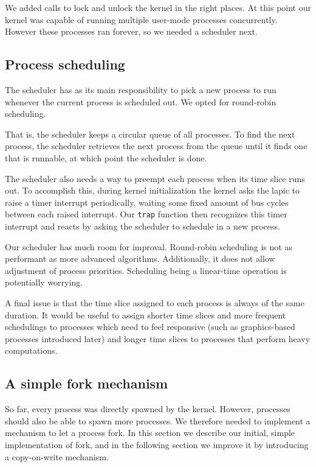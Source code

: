 \documentclass{article}
\begin{document}
We added calls to lock and unlock the kernel in the right places. At this
point our kernel was capable of running multiple user-mode processes
concurrently. However these processes ran forever, so we needed a scheduler
next.


\subsection{Process scheduling}
\label{sec:preempt}
The scheduler has as its main responsibility to pick a new process to run
whenever the current process is scheduled out. We opted for round-robin
scheduling.

That is, the scheduler keeps a circular queue of all processes. To find the
next process, the scheduler retrieves the next process from the queue until it
finds one that is runnable, at which point the scheduler is done.

The scheduler also needs a way to preempt each process when its time slice
runs out. To accomplish this, during kernel initialization the kernel asks the
\gls{lapic} to raise a timer interrupt periodically, waiting some fixed amount
of bus cycles between each raised interrupt. Our \texttt{trap} function then
recognizes this timer interrupt and reacts by asking the scheduler to schedule
in a new process.

Our scheduler has much room for improval. Round-robin scheduling is not as
performant as more advanced algorithms. Additionally, it does not allow
adjustment of process priorities. Scheduling being a linear-time operation is
potentially worrying. 

A final issue is that the time slice assigned to each process is always of the
same duration. It would be useful to assign shorter time slices and more
frequent schedulings to processes which need to feel responsive (such as
graphics-based processes introduced later) and longer time slices to processes
that perform heavy computations.


\subsection{A simple fork mechanism}
So far, every process was directly spawned by the kernel. However, processes
should also be able to spawn more processes. We therefore needed to implement
a mechanism to let a process fork. In this section we describe our initial,
simple implementation of fork, and in the following section we improve it by
introducing a copy-on-write mechanism.
\end{document}
